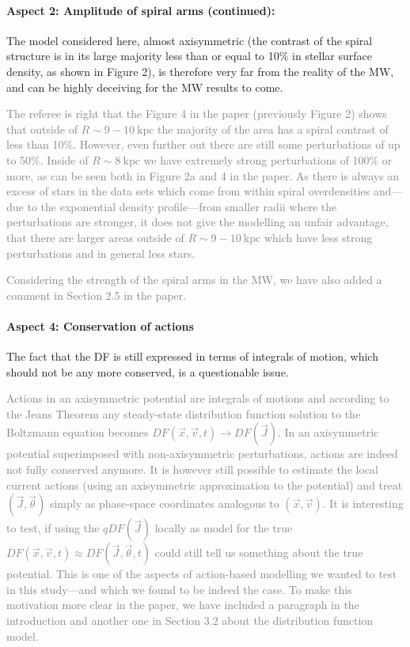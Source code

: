 \documentclass[10pt,a4paper]{article}
\newcommand{\Answer}[1]{\textcolor{Gray}{#1}}
\begin{document}
\paragraph{Aspect 2: Amplitude of spiral arms (continued):} The model considered here, almost axisymmetric (the contrast of the spiral structure is in its large majority less than or equal to 10\% in stellar surface density, as shown in Figure 2),  is therefore very far from the reality of the MW, and can be highly deceiving for the MW results to come.

\Answer{The referee is right that the Figure 4 in the paper (previously Figure 2) shows that outside of $R\sim9-10~\text{kpc}$ the majority of the area has a spiral contrast of less than 10\%. However, even further out there are still some perturbations of up to 50\%. Inside of $R\sim8~\text{kpc}$ we have extremely strong perturbations of 100\% or more, as can be seen both in Figure 2a and 4 in the paper. As there is always an excess of stars in the data sets which come from within spiral overdensities and---due to the exponential density profile---from smaller radii where the perturbations are stronger, it does not give the modelling an unfair advantage, that there are larger areas outside of $R\sim9-10~\text{kpc}$ which have less strong perturbations and in general less stars.}

\Answer{Considering the strength of the spiral arms in the MW, we have also added a comment in Section 2.5 in the paper.}

\paragraph{Aspect 4: Conservation of actions} The fact that the DF is still expressed in terms of integrals of motion, which should not be any more conserved, is a questionable issue.

\Answer{Actions in an axisymmetric potential are integrals of motions and according to the Jeans Theorem any steady-state distribution function solution to the Boltzmann equation becomes $DF(\vec{x},\vec{v},t) \longrightarrow DF(\vec{J})$. In an axisymmetric potential superimposed with non-axisymmetric perturbations, actions are indeed not fully conserved anymore. It is however still possible to estimate the local current actions (using an axisymmetric approximation to the potential) and treat $(\vec{J},\vec{\theta})$ simply as phase-space coordinates analogous to $(\vec{x},\vec{v})$. It is interesting to test, if using the $qDF(\vec{J})$ locally as model for the true $DF(\vec{x},\vec{v},t)\approx DF(\vec{J},\vec{\theta},t)$ could still tell us something about the true potential. This is one of the aspects of action-based modelling we wanted to test in this study---and which we found to be indeed the case. To make this motivation more clear in the paper, we have included a paragraph in the introduction and another one in Section 3.2 about the distribution function model.}
\end{document}
